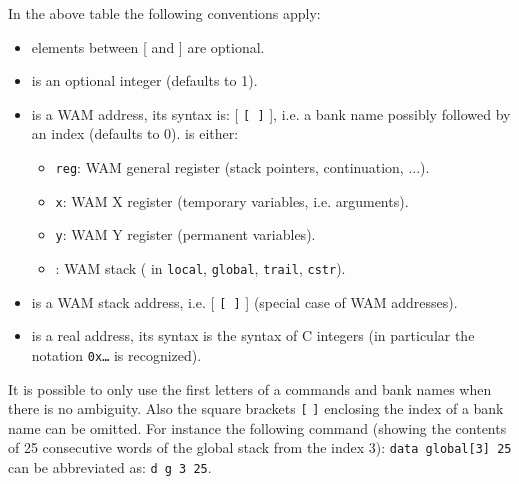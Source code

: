In the above table the following conventions apply:

\begin{itemize}

\item elements between [ and ] are optional.

\item {} is an optional integer (defaults to 1).

\item {} is a WAM address, its syntax is:
 [ \texttt{[  ]} ], i.e. a bank name
possibly followed by an index (defaults to 0). 
is either:

\begin{itemize}

\item \texttt{reg}: WAM general register (stack pointers, continuation,
...). 

\item \texttt{x}: WAM X register (temporary variables, i.e. arguments).

\item \texttt{y}: WAM Y register (permanent variables).

\item {}: WAM stack
( in \texttt{local}, \texttt{global}, \texttt{trail},
\texttt{cstr}).

\end{itemize}

\item {} is a WAM stack address, i.e.
\texttt{} [ \texttt{[  ]} ] (special case of
WAM addresses).

\item {} is a real address, its syntax is the syntax of C
integers (in particular the notation \texttt{0x\ldots} is recognized).

\end{itemize}

It is possible to only use the first letters of a commands and bank names
when there is no ambiguity. Also the square brackets \texttt{[} \texttt{]}
enclosing the index of a bank name can be omitted. For instance the
following command (showing the contents of 25 consecutive words of the
global stack from the index 3): \texttt{data global[3] 25} can be
abbreviated as: \texttt{d g 3 25}.

